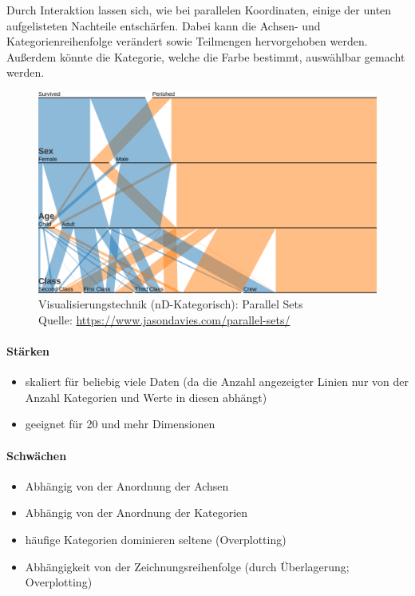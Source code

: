 				Durch Interaktion lassen sich, wie bei parallelen Koordinaten, einige der unten aufgelisteten Nachteile entschärfen. Dabei kann \bspw die Achsen- und Kategorienreihenfolge verändert sowie Teilmengen hervorgehoben werden. Außerdem könnte die Kategorie, welche die Farbe bestimmt, auswählbar gemacht werden.

				\begin{figure}
					\centering
					\includegraphics[width=0.9\linewidth]{parallelsets}
					\caption[Visualisierungstechnik (nD-Kategorisch): Parallel Sets]{Visualisierungstechnik (nD-Kategorisch): Parallel Sets\\Quelle: \url{https://www.jasondavies.com/parallel-sets/}}
					\label{fig:parallelsets}
				\end{figure}

				\paragraph{Stärken}
				\begin{itemize}
					\item skaliert für beliebig viele Daten (da die Anzahl angezeigter Linien nur von der Anzahl Kategorien und Werte in diesen abhängt)
					\item geeignet für 20 und mehr Dimensionen
				\end{itemize}

				\paragraph{Schwächen}
				\begin{itemize}
					\item Abhängig von der Anordnung der Achsen
					\item Abhängig von der Anordnung der Kategorien
					\item häufige Kategorien dominieren seltene (Overplotting)
					\item Abhängigkeit von der Zeichnungsreihenfolge (durch Überlagerung; Overplotting)
				\end{itemize}

